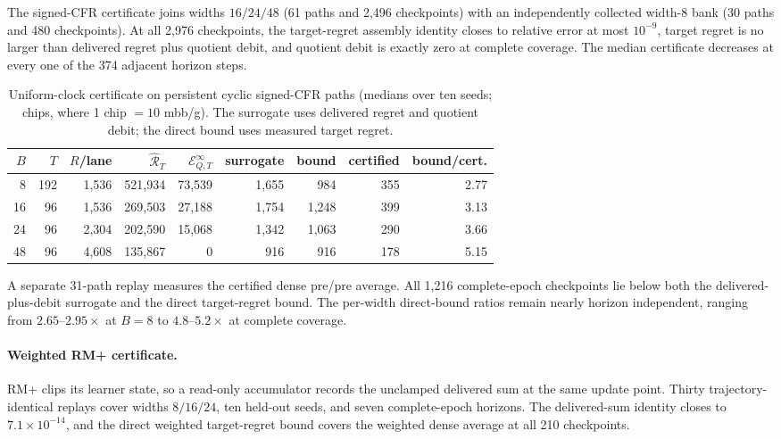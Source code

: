 The signed-CFR certificate joins widths $16/24/48$ (61 paths and 2,496
checkpoints) with an independently collected width-8 bank (30 paths and 480
checkpoints).  At all 2,976 checkpoints, the target-regret assembly identity
closes to relative error at most $10^{-9}$, target regret is no larger than
delivered regret plus quotient debit, and quotient debit is exactly zero at
complete coverage.  The median certificate decreases at every one of the 374
adjacent horizon steps.

\begin{table}[h]
\caption{Uniform-clock certificate on persistent cyclic signed-CFR paths
(medians over ten seeds; chips, where 1 chip $=10$ mbb/g).  The surrogate
uses delivered regret and quotient debit; the direct bound uses measured
target regret.}
\label{tab:certificate-audit}
\centering
\footnotesize
\setlength{\tabcolsep}{2.4pt}
\begin{tabular}{@{}rrrrrrrrr@{}}
\toprule
$B$ & $T$ & $R$/lane & $\widehat{\mathcal R}_T$ & $\mathcal E_{Q,T}^\infty$ &
surrogate & bound & certified & bound/cert. \\
\midrule
8 & 192 & 1,536 & 521,934 & 73,539 & 1,655 & 984 & 355 & 2.77 \\
16 & 96 & 1,536 & 269,503 & 27,188 & 1,754 & 1,248 & 399 & 3.13 \\
24 & 96 & 2,304 & 202,590 & 15,068 & 1,342 & 1,063 & 290 & 3.66 \\
48 & 96 & 4,608 & 135,867 & 0 & 916 & 916 & 178 & 5.15 \\
\bottomrule
\end{tabular}
\end{table}

A separate 31-path replay measures the certified dense pre/pre average.  All
1,216 complete-epoch checkpoints lie below both the delivered-plus-debit
surrogate and the direct target-regret bound.  The per-width direct-bound
ratios remain nearly horizon independent, ranging from
$2.65$--$2.95\times$ at $B=8$ to $4.8$--$5.2\times$ at complete coverage.

\paragraph{Weighted RM+ certificate.}
\label{app:rmplus-certificate}
RM+ clips its learner state, so a read-only accumulator records the unclamped
delivered sum at the same update point.  Thirty trajectory-identical replays
cover widths $8/16/24$, ten held-out seeds, and seven complete-epoch horizons.
The delivered-sum identity closes to $7.1\times10^{-14}$, and the direct
weighted target-regret bound covers the weighted dense average at all 210
checkpoints.

